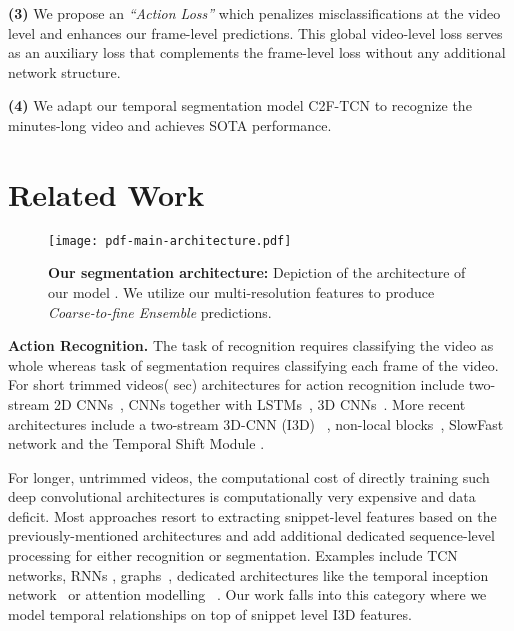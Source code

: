 \documentclass[10pt,twocolumn,letterpaper]{article}
\newcommand{\modelname}{C2F-TCN}
\begin{document}
    \textbf{(3)} We propose an \emph{``Action Loss''} which penalizes misclassifications at the video level and enhances our frame-level predictions. This global video-level loss serves as an auxiliary loss that complements the frame-level loss without any additional network structure.
    
    \textbf{(4)} We adapt our temporal segmentation model \modelname{} to recognize the minutes-long video and achieves SOTA performance.
    
\section{Related Work}
\begin{figure*}
\begin{center}
\texttt{[image: pdf-main-architecture.pdf]}
\end{center}
\caption{\textbf{Our segmentation architecture:} Depiction of the architecture of our model . We utilize our multi-resolution features to produce \textit{Coarse-to-fine Ensemble} predictions.}

\label{fig:main_architecture}
\end{figure*}
\textbf{Action Recognition.} The task of recognition requires classifying the video as whole whereas task of segmentation requires classifying each frame of the video. For short trimmed videos( sec) architectures for action recognition include two-stream 2D CNNs~\cite{trimmed2d-feichtenhofer2016convolutional, trimmed2d-simonyan2014two}, CNNs together with LSTMs~\cite{trimmed2dlstm-donahue2015long, trimmed2dlstm-ullah2017action}, 3D CNNs~\cite{trimmed3d-ji20123d, trimmed3d-tran2015learning}.  More recent architectures include a two-stream 3D-CNN (I3D)~\cite{carreira2017quo}
, non-local blocks~\cite{trimmednon-wang2018non}, SlowFast network \cite{longvideosrecog-feichtenhofer2019slowfast} and the Temporal Shift Module \cite{lin2019tsm}.

For longer, untrimmed videos, the computational cost of directly training such deep  convolutional architectures is computationally very expensive and data deficit. Most approaches resort to extracting snippet-level features based on the previously-mentioned architectures and add additional dedicated sequence-level processing for either recognition or segmentation.
Examples include TCN networks\cite{TED-ding2018weakly, TED-lea2017temporal, TEDresi-lei2018temporal, li2020ms, farha2019ms}, RNNs \cite{prevsegmentrnn-kuehne2018hybrid, prevsegmentrnn-singh2016multi, prevsegmentrnn-perrett2017recurrent}, graphs~\cite{highlevel-hussein2019videograph}, dedicated architectures like the temporal inception network~\cite{highlevel-hussein2019timeception} or attention modelling ~\cite{highlevel-hussein2020pic, sener2020temporal}. Our work falls into this category where we model temporal relationships on top of snippet level I3D features. 
\end{document}
